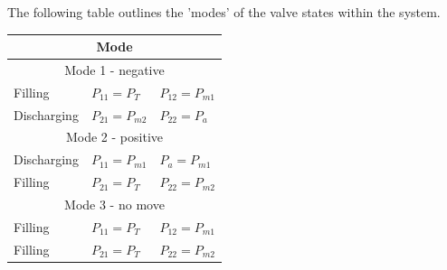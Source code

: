 \documentclass[11pt,a4paper]{article}
\begin{document}
\begin{appendices}
The following table outlines the 'modes' of the valve states within the system.\newline
\begin{table}[!hbt]
    \centering
    \begin{tabular}{l l l}
        \multicolumn{3}{c}{\textbf{Mode}} \\
        \hline
            \multicolumn{3}{c}{Mode 1 - negative}\\
        \hline   
            Filling & $P_{11} = P_{T}$ & $P_{12} = P_{m1}$\\
            Discharging & $P_{21} = P_{m2}$ & $P_{22} = P_{a}$\\
        \hline
            \multicolumn{3}{c}{Mode 2 - positive}\\
        \hline
            Discharging & $P_{11} = P_{m1}$ & $P_{a} = P_{m1}$ \\
            Filling & $P_{21} = P_{T}$ & $P_{22} = P_{m2}$ \\
        \hline
            \multicolumn{3}{c}{Mode 3 - no move}\\
        \hline    
            Filling & $P_{11} = P_{T}$ & $P_{12} = P_{m1}$\\
            Filling & $P_{21} = P_{T}$ & $P_{22} = P_{m2}$\\
        \hline
    \end{tabular}
\end{table}


\end{appendices}
\end{document}
